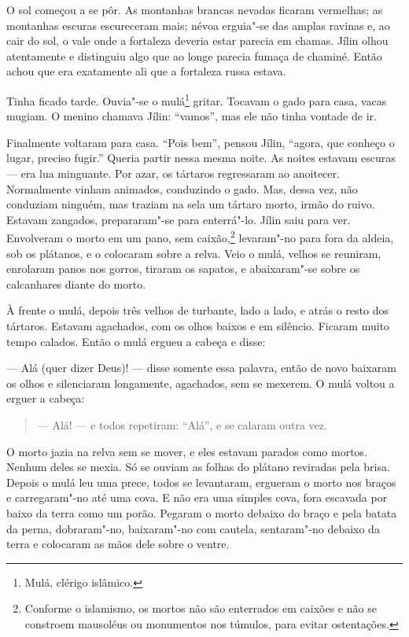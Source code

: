O sol começou a se pôr. As montanhas brancas nevadas ficaram vermelhas;
as montanhas escuras escureceram mais; névoa erguia"-se das amplas
ravinas e, ao cair do sol, o vale onde a fortaleza deveria estar parecia
em chamas. Jílin olhou atentamente e distinguiu algo que ao longe
parecia fumaça de chaminé. Então achou que era exatamente ali que a
fortaleza russa estava.

Tinha ficado tarde. Ouvia"-se o mulá\footnote{Mulá, clérigo islâmico.}
gritar. Tocavam o gado para casa, vacas mugiam. O menino chamava Jílin:
``vamos'', mas ele não tinha vontade de ir.

Finalmente voltaram para casa. ``Pois bem'', pensou Jílin, ``agora, que
conheço o lugar, preciso fugir.'' Queria partir nessa mesma noite. As
noites estavam escuras --- era lua minguante. Por azar, os tártaros
regressaram ao anoitecer. Normalmente vinham animados, conduzindo o
gado. Mas, dessa vez, não conduziam ninguém, mas traziam na sela um
tártaro morto, irmão do ruivo. Estavam zangados, prepararam"-se para
enterrá"-lo. Jílin saiu para ver. Envolveram o morto em um pano, sem
caixão,\footnote{Conforme o islamismo, os mortos não são enterrados em
  caixões e não se constroem mausoléus ou monumentos nos túmulos, para
  evitar ostentações.} levaram"-no para fora da aldeia, sob os plátanos,
e o colocaram sobre a relva. Veio o mulá, velhos se reuniram, enrolaram
panos nos gorros, tiraram os sapatos, e abaixaram"-se sobre os
calcanhares diante do morto.

À frente o mulá, depois três velhos de turbante, lado a lado, e atrás o
resto dos tártaros. Estavam agachados, com os olhos baixos e em
silêncio. Ficaram muito tempo calados. Então o mulá ergueu a cabeça e
disse:

--- Alá (quer dizer Deus)! --- disse somente essa palavra, então de novo
baixaram os olhos e silenciaram longamente, agachados, sem se mexerem. O
mulá voltou a erguer a cabeça:

\begin{quote}
--- Alá! --- e todos repetiram: ``Alá'', e se calaram outra vez.
\end{quote}

O morto jazia na relva sem se mover, e eles estavam parados como mortos.
Nenhum deles se mexia. Só se ouviam as folhas do plátano reviradas pela
brisa. Depois o mulá leu uma prece, todos se levantaram, ergueram o
morto nos braços e carregaram"-no até uma cova. E não era uma simples
cova, fora escavada por baixo da terra como um porão. Pegaram o morto
debaixo do braço e pela batata da perna, dobraram"-no, baixaram"-no com
cautela, sentaram"-no debaixo da terra e colocaram as mãos dele sobre o
ventre.


